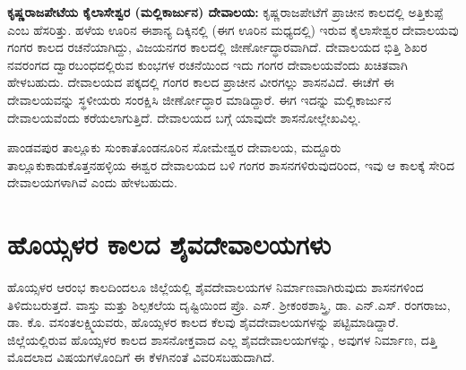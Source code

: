 \vskip -1pt

\textbf{ಕೃಷ್ಣರಾಜಪೇಟೆಯ ಕೈಲಾಸೇಶ್ವರ (ಮಲ್ಲಿಕಾರ್ಜುನ) ದೇವಾಲಯ:} ಕೃಷ್ಣರಾಜಪೇಟೆಗೆ ಪ್ರಾಚೀನ ಕಾಲದಲ್ಲಿ ಅತ್ತಿಕುಪ್ಪೆ ಎಂಬ ಹೆಸರಿತ್ತು. ಹಳೆಯ ಊರಿನ ಈಶಾನ್ಯ ದಿಕ್ಕಿನಲ್ಲಿ (ಈಗ ಊರಿನ ಮಧ್ಯದಲ್ಲಿ) ಇರುವ ಕೈಲಾಸೇಶ್ವರ ದೇವಾಲಯವು ಗಂಗರ ಕಾಲದ ರಚನೆಯಾಗಿದ್ದು, ವಿಜಯನಗರ ಕಾಲದಲ್ಲಿ ಜೀರ್ಣೋದ್ಧಾರವಾಗಿದೆ. ದೇವಾಲಯದ ಭಿತ್ತಿ ಶಿಖರ ನವರಂಗದ ದ್ವಾರಬಂಧದಲ್ಲಿರುವ ಕುಂಭಗಳ ರಚನೆಯಿಂದ ಇದು ಗಂಗರ ದೇವಾಲಯವೆಂದು ಖಚಿತವಾಗಿ ಹೇಳಬಹುದು. ದೇವಾಲಯದ ಪಕ್ಕದಲ್ಲಿ ಗಂಗರ ಕಾಲದ ಪ್ರಾಚೀನ ವೀರಗಲ್ಲು ಶಾಸನವಿದೆ. ಈಚೆಗೆ ಈ ದೇವಾಲಯವನ್ನು ಸ್ಥಳೀಯರು ಸಂರಕ್ಷಿಸಿ ಜೀರ್ಣೋದ್ಧಾರ ಮಾಡಿದ್ದಾರೆ. ಈಗ ಇದನ್ನು ಮಲ್ಲಿಕಾರ್ಜುನ ದೇವಾಲಯವೆಂದು ಕರೆಯಲಾಗುತ್ತಿದೆ. ದೇವಾಲಯದ ಬಗ್ಗೆ ಯಾವುದೇ ಶಾಸನೋಲ್ಲೇಖವಿಲ್ಲ.

\vskip -1pt

ಪಾಂಡವಪುರ ತಾಲ್ಲೂಕು ಸುಂಕಾತೊಂಡನೂರಿನ ಸೋಮೇಶ್ವರ ದೇವಾಲಯ, ಮದ್ದೂರು ತಾಲ್ಲೂಕು\break ಕಾಡುಕೊತ್ತನಹಳ್ಳಿಯ ಈಶ್ವರ ದೇವಾಲಯದ ಬಳಿ ಗಂಗರ ಶಾಸನಗಳಿರುವುದರಿಂದ, ಇವು ಆ ಕಾಲಕ್ಕೆ ಸೇರಿದ ದೇವಾಲಯ\-ಗಳಾಗಿವೆ ಎಂದು ಹೇಳಬಹುದು.

\vskip -1pt

\section*{ಹೊಯ್ಸಳರ ಕಾಲದ ಶೈವದೇವಾಲಯಗಳು}

ಹೊಯ್ಸಳರ ಆರಂಭ ಕಾಲದಿಂದಲೂ ಜಿಲ್ಲೆಯಲ್ಲಿ ಶೈವದೇವಾಲಯಗಳ ನಿರ್ಮಾಣವಾಗಿರುವುದು ಶಾಸನಗಳಿಂದ ತಿಳಿದು\-ಬರುತ್ತದೆ. ವಾಸ್ತು ಮತ್ತು ಶಿಲ್ಪಕಲೆಯ ದೃಷ್ಟಿಯಿಂದ ಪ್ರೊ. ಎಸ್​. ಶ‍್ರೀಕಂಠಶಾಸ್ತ್ರಿ, ಡಾ. ಎನ್​.ಎಸ್​. ರಂಗರಾಜು, ಡಾ. ಕೊ. ವಸಂತಲಕ್ಷ್ಮಿ\-ಯವರು, ಹೊಯ್ಸಳರ ಕಾಲದ ಕೆಲವು ಶೈವದೇವಾಲಯಗಳನ್ನು ಪಟ್ಟಿಮಾಡಿದ್ದಾರೆ. ಜಿಲ್ಲೆಯಲ್ಲಿರುವ ಹೊಯ್ಸಳರ ಕಾಲದ ಶಾಸನೋಕ್ತವಾದ ಎಲ್ಲ ಶೈವದೇವಾಲಯಗಳನ್ನು, ಅವುಗಳ ನಿರ್ಮಾಣ, ದತ್ತಿ ಮೊದಲಾದ ವಿಷಯಗಳೊಂದಿಗೆ ಈ ಕೆಳಗಿನಂತೆ ವಿವರಿಸಬಹುದಾಗಿದೆ.

